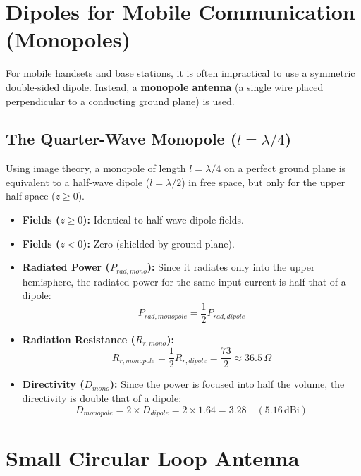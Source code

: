 \documentclass[12pt,a4paper]{article}
\begin{document}
\section{Dipoles for Mobile Communication (Monopoles)}

For mobile handsets and base stations, it is often impractical to use a symmetric double-sided dipole. Instead, a \textbf{monopole antenna} (a single wire placed perpendicular to a conducting ground plane) is used.

\subsection{The Quarter-Wave Monopole (\texorpdfstring{$l = \lambda/4$}{l = lambda/4})}
Using image theory, a monopole of length $l = \lambda/4$ on a perfect ground plane is equivalent to a half-wave dipole ($l = \lambda/2$) in free space, but only for the upper half-space ($z \ge 0$).

\begin{itemize}[leftmargin=*, itemsep=3pt]
  \item \textbf{Fields ($z \ge 0$):} Identical to half-wave dipole fields.
  \item \textbf{Fields ($z < 0$):} Zero (shielded by ground plane).
  \item \textbf{Radiated Power ($P_{rad, mono}$):} Since it radiates only into the upper hemisphere, the radiated power for the same input current is half that of a dipole:
  \[
  P_{rad, monopole} = \frac{1}{2} P_{rad, dipole}
  \]
  \item \textbf{Radiation Resistance ($R_{r, mono}$):}
  \[
  R_{r, monopole} = \frac{1}{2} R_{r, dipole} = \frac{73}{2} \approx 36.5\,\Omega
  \]
  \item \textbf{Directivity ($D_{mono}$):} Since the power is focused into half the volume, the directivity is double that of a dipole:
  \[
  D_{monopole} = 2 \times D_{dipole} = 2 \times 1.64 = 3.28 \quad (5.16\,\text{dBi})
  \]
\end{itemize}

\section{Small Circular Loop Antenna}
\end{document}
